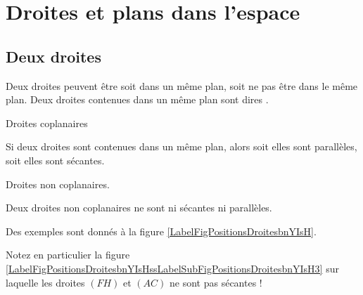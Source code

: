 \section{Droites et plans dans l'espace}

\subsection{Deux droites}

Deux droites peuvent être soit dans un même plan, soit ne pas être dans le même plan. Deux droites contenues dans un même plan sont dires .
\begin{multicols}{2}
    \begin{center}
        Droites coplanaires
    \end{center}
\begin{Aretenir}
    Si deux droites sont contenues dans un même plan, alors soit elles sont parallèles, soit elles sont sécantes. 
\end{Aretenir}

    \columnbreak

    \begin{center}
        Droites non coplanaires.
    \end{center}
\begin{Aretenir}
    Deux droites non coplanaires ne sont ni sécantes ni parallèles.
\end{Aretenir}

\end{multicols}

Des exemples sont donnés à la figure \ref{LabelFigPositionsDroitesbnYIsH}. %
\newcommand{\CaptionFigPositionsDroitesbnYIsH}{Droites coplanaires ou non.}


Notez en particulier la figure \ref{LabelFigPositionsDroitesbnYIsHssLabelSubFigPositionsDroitesbnYIsH3} sur laquelle les droites \( (FH)\) et \( (AC)\) ne sont pas sécantes !

